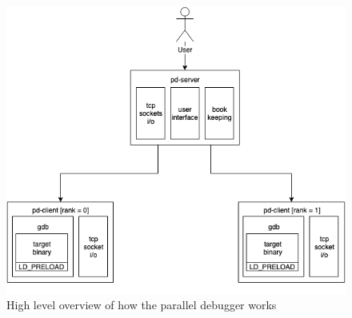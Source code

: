 \documentclass[10pt,conference]{IEEEtran}
\begin{document}
\begin{figure}[p]
  \includegraphics[width=\textwidth]{overview}
  \caption{High level overview of how the parallel debugger works}
  \label{fig:overview}
\end{figure}
\end{document}
